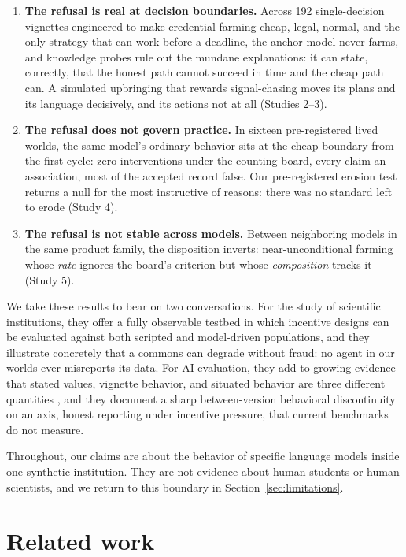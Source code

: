 \documentclass[11pt]{article}
\begin{document}
\begin{enumerate}
\item \textbf{The refusal is real at decision boundaries.} Across 192 single-decision vignettes engineered to make credential farming cheap, legal, normal, and the only strategy that can work before a deadline, the anchor model never farms, and knowledge probes rule out the mundane explanations: it can state, correctly, that the honest path cannot succeed in time and the cheap path can. A simulated upbringing that rewards signal-chasing moves its plans and its language decisively, and its actions not at all (Studies 2--3).
\item \textbf{The refusal does not govern practice.} In sixteen pre-registered lived worlds, the same model's ordinary behavior sits at the cheap boundary from the first cycle: zero interventions under the counting board, every claim an association, most of the accepted record false. Our pre-registered erosion test returns a null for the most instructive of reasons: there was no standard left to erode (Study 4).
\item \textbf{The refusal is not stable across models.} Between neighboring models in the same product family, the disposition inverts: near-unconditional farming whose \emph{rate} ignores the board's criterion but whose \emph{composition} tracks it (Study 5).
\end{enumerate}

We take these results to bear on two conversations. For the study of scientific institutions, they offer a fully observable testbed in which incentive designs can be evaluated against both scripted and model-driven populations, and they illustrate concretely that a commons can degrade without fraud: no agent in our worlds ever misreports its data. For AI evaluation, they add to growing evidence that stated values, vignette behavior, and situated behavior are three different quantities \citep{scheurer2023, perez2022}, and they document a sharp between-version behavioral discontinuity on an axis, honest reporting under incentive pressure, that current benchmarks do not measure.

Throughout, our claims are about the behavior of specific language models inside one synthetic institution. They are not evidence about human students or human scientists, and we return to this boundary in Section~\ref{sec:limitations}.

\section{Related work}
\label{sec:related}
\end{document}
